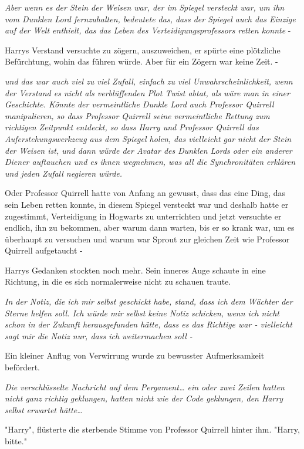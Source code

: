 {\emph{Aber wenn es der Stein der Weisen war, der im Spiegel versteckt war, um ihn vom Dunklen Lord fernzuhalten, bedeutete das, dass der Spiegel auch das Einzige auf der Welt enthielt, das das Leben des Verteidigungsprofessors retten konnte} -

Harrys Verstand versuchte zu zögern, auszuweichen, er spürte eine plötzliche Befürchtung, wohin das führen würde. Aber für ein Zögern war keine Zeit. -

\emph{und das war auch viel zu viel Zufall, einfach zu viel Unwahrscheinlichkeit, wenn der Verstand es nicht als verblüffenden Plot Twist abtat, als wäre man in einer Geschichte. Könnte der vermeintliche Dunkle Lord auch Professor Quirrell manipulieren, so dass Professor Quirrell seine vermeintliche Rettung zum richtigen Zeitpunkt entdeckt, so dass Harry und Professor Quirrell das Auferstehungswerkzeug aus dem Spiegel holen, das vielleicht gar nicht der Stein der Weisen ist, und dann würde der Avatar des Dunklen Lords oder ein anderer Diener auftauchen und es ihnen wegnehmen, was all die Synchronitäten erklären und jeden Zufall negieren würde.}

Oder Professor Quirrell hatte von Anfang an gewusst, dass das eine Ding, das sein Leben retten konnte, in diesem Spiegel versteckt war und deshalb hatte er zugestimmt, Verteidigung in Hogwarts zu unterrichten und jetzt versuchte er endlich, ihn zu bekommen, aber warum dann warten, bis er so krank war, um es überhaupt zu versuchen und warum war Sprout zur gleichen Zeit wie Professor Quirrell aufgetaucht -

Harrys Gedanken stockten noch mehr. Sein inneres Auge schaute in eine Richtung, in die es sich normalerweise nicht zu schauen traute.

\emph{In der Notiz, die ich mir selbst geschickt habe, stand, dass ich dem Wächter der Sterne helfen soll. Ich würde mir selbst keine Notiz schicken, wenn ich nicht schon in der Zukunft herausgefunden hätte, dass es das Richtige war - vielleicht sagt mir die Notiz nur, dass ich weitermachen soll -}

Ein kleiner Anflug von Verwirrung wurde zu bewusster Aufmerksamkeit befördert.

\emph{Die verschlüsselte Nachricht auf dem Pergament… ein oder zwei Zeilen hatten nicht ganz richtig geklungen, hatten nicht wie der Code geklungen, den Harry selbst erwartet hätte…}

"Harry", flüsterte die sterbende Stimme von Professor Quirrell hinter ihm. "Harry, bitte."

}
